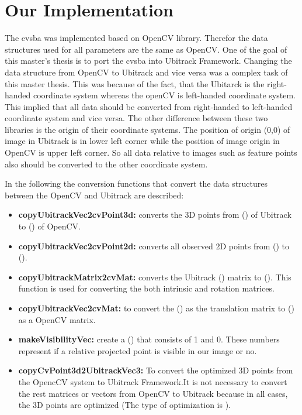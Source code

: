 \section{Our Implementation}
The cvsba was implemented based on OpenCV library. Therefor the data structures used for all parameters are the same as OpenCV. One of the goal of this master's thesis is to port the cvsba into Ubitrack Framework. Changing the data structure from OpenCV to Ubitrack and vice versa was a complex task of this master thesis. This was because of the fact, that the Ubitarck is the right-handed coordinate system whereas the openCV is left-handed coordinate system. This implied that all data should be converted from right-handed to left-handed coordinate system and vice versa. The other difference between these two libraries is the origin of their coordinate systems. The position of origin (0,0) of image in Ubitrack is in lower left corner while the position of image origin in OpenCV is upper left corner. So all data relative to images such as feature points also should be converted to the other coordinate system.

In the following the conversion functions that convert the data structures between the OpenCV and Ubitrack are described:
\begin{itemize}
\item \textbf{copyUbitrackVec2cvPoint3d:} converts the 3D points from  () of Ubitrack to () of OpenCV. 
\item \textbf{copyUbitrackVec2cvPoint2d:} converts all observed 2D points from () to ().
\item \textbf{copyUbitrackMatrix2cvMat:} converts the Ubitrack () matrix to (). This function is used for converting the both intrinsic and rotation matrices.
\item \textbf{copyUbitrackVec2cvMat:} to convert the () as the translation matrix to () as a OpenCV matrix.
\item \textbf{makeVisibilityVec:} create a () that consists of 1 and 0. These numbers represent if a relative projected point is visible in our image or no.
\item \textbf{copyCvPoint3d2UbitrackVec3:} To convert the optimized 3D points from the OpencCV system to Ubitrack Framework.It is not necessary to convert the rest matrices or vectors from OpenCV to Ubitrack because in all cases, the 3D points are optimized (The type of optimization is ).
\end{itemize}

